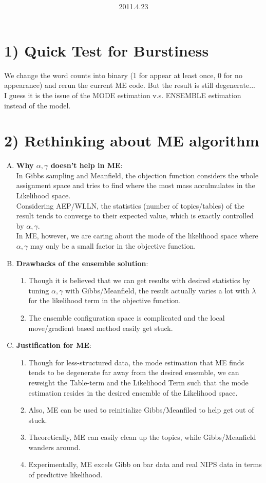 \documentclass{article}
\title{\vspace{0.3in}\textmd{\textbf{\hmwkTitle}}}
\date{2011.4.23}
\author{\textbf{\hmwkAuthorName}}
\begin{document}
\begin{spacing}{1.1}
\maketitle
\section{1) Quick Test for Burstiness}
We change the word counts into binary (1 for appear at least once, 0 for no appearance) and rerun the current ME code.
But the result is still degenerate...\\
I guess it is the issue of the MODE estimation v.s. ENSEMBLE estimation instead of the model.
\section{2) Rethinking about ME algorithm}
\begin{enumerate}[(A)]
 \item {\bf Why $\alpha,\gamma$ doesn't help in ME}:\\
In Gibbs sampling and Meanfield, the objection function considers the whole assignment space and tries to find where the most mass acculmulates in the Likelihood space.\\
Considering AEP/WLLN, the statistics (number of topics/tables) of the result tends to converge to their expected value, which is exactly controlled by $\alpha,\gamma$.\\
In ME, however, we are caring about the mode of the likelihood space where $\alpha,\gamma$ may only be a small factor in the objective function.
 \item {\bf Drawbacks of the ensemble solution}:\\
\begin{enumerate}[1]
 \item Though it is believed that we can get results with desired statistics by tuning $\alpha,\gamma$ with Gibbs/Meanfield,
the result actually varies a lot with $\lambda$ for the likelihood term in the objective function.
 \item The ensemble configuration space is complicated and the local move/gradient based method easily get stuck.
\end{enumerate}
 \item {\bf Justification for ME}:\\
\begin{enumerate}[1]
\item Though for less-structured data, the mode estimation that ME finds tends to be degenerate
far away from the desired ensemble,  
we can reweight the Table-term and the Likelihood Term such that 
the mode estimation resides in the desired ensemble of the Likelihood space.
\item Also, ME can be used to reinitialize Gibbs/Meanfiled to help get out of stuck.
\item Theoretically, ME can easily clean up the topics, while Gibbs/Meanfield wanders around.
\item Experimentally, ME excels Gibb on bar data and real NIPS data in terms of predictive likelihood.
\end{enumerate}


\end{enumerate}
\end{spacing}
\end{document}
